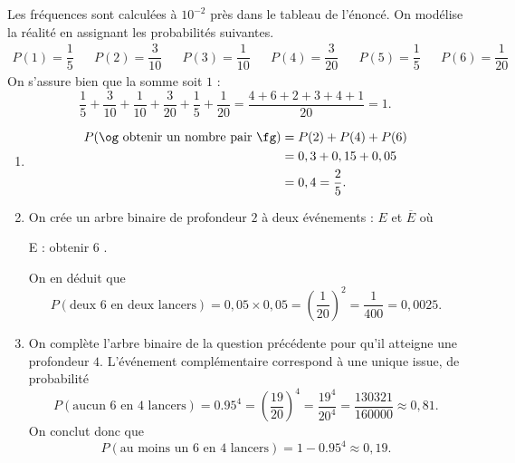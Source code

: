 \begin{sol}
	Les fréquences sont calculées à $10^{-2}$ près dans le tableau de l'énoncé.
	On modélise la réalité en assignant les probabilités suivantes.
		\begin{align*}
			P(1) = \dfrac15 && P(2) = \dfrac3{10} && P(3) = \dfrac1{10} && P(4) = \dfrac3{20} && P(5) = \dfrac15 && P(6) = \dfrac1{20}
		\end{align*}
	On s'assure bien que la somme soit $1$ : 
		\[ \dfrac15 + \dfrac3{10} + \dfrac1{10} + \dfrac3{20} + \dfrac15 + \dfrac1{20} = \dfrac{4+6+2+3+4+1}{20} = 1. \]
	
	\begin{enumerate}
		\item 
			\begin{align*}
				P(\text{\og obtenir un nombre pair \fg}) &= P(2) + P(4) + P(6) \\
				&= 0,3 + 0,15 + 0,05 \\
				&= 0,4 = \frac25.
			\end{align*}
		\item
			On crée un arbre binaire de profondeur $2$ à deux événements : $E$ et $\overline{E}$ où
				\begin{center}
					E : \og obtenir $6$ \fg.
				\end{center}
			On en déduit que
			\[ P(\text{deux $6$ en deux lancers}) = 0,05 \times 0,05 = \left(\dfrac1{20}\right)^2 = \dfrac1{400} = 0,0025. \]
		\item
			On complète l'arbre binaire de la question précédente pour qu'il atteigne une profondeur $4$.
			L'événement complémentaire correspond à une unique issue, de probabilité
				\[ P(\text{aucun $6$ en $4$ lancers}) = 0.95^4 = \left(\dfrac{19}{20}\right)^4 = \dfrac{19^4}{20^4} = \dfrac{130321}{160000} \approx 0,81. \]
			On conclut donc que
				\[ P(\text{au moins un $6$ en $4$ lancers}) = 1-0.95^4 \approx 0,19. \]
				
	\end{enumerate}

\end{sol}
\fi


